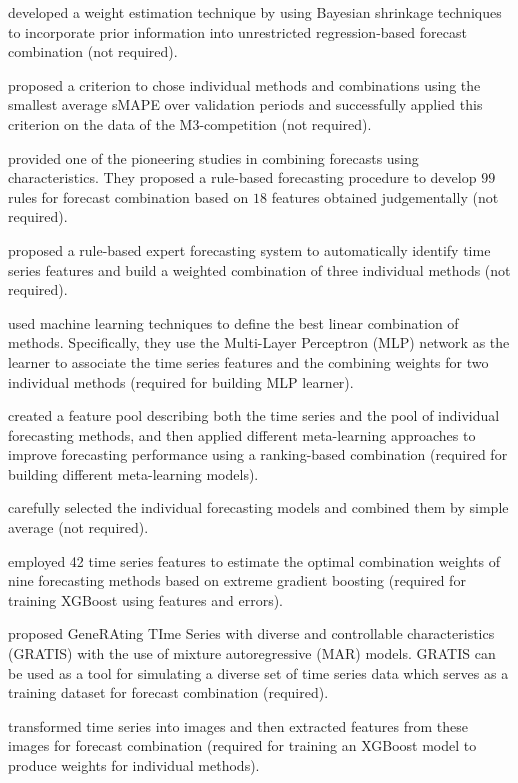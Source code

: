 \documentclass[11pt]{article}
\begin{document}
\cite{diebold1990use} developed a weight estimation technique by using Bayesian shrinkage techniques to incorporate prior information into unrestricted regression-based forecast combination (not required).

\cite{hibon2005combine} proposed a criterion to chose individual methods and combinations using the smallest average sMAPE over validation periods and successfully applied this criterion on the data of the M3-competition (not required).

\cite{collopy1992rule} provided one of the pioneering studies in combining forecasts using characteristics. They proposed a rule-based forecasting procedure to develop $99$ rules for forecast combination based on $18$ features obtained judgementally (not required).

\cite{vokurka1996automatic} proposed a rule-based expert forecasting system to automatically identify time series features and build a weighted combination of three individual methods (not required).

\cite{prudencio2004using} used machine learning techniques to define the best linear combination of methods. Specifically, they use the Multi-Layer Perceptron (MLP) network as the learner to associate the time series features and the combining weights for two individual methods (required for building MLP learner).

\cite{lemke2010meta} created a feature pool describing both the time series and the pool of individual forecasting methods, and then applied different meta-learning approaches to improve forecasting performance using a ranking-based combination (required for building different meta-learning models).

\cite{andrawis2011forecast} carefully selected the individual forecasting models and combined them by simple average (not required).

\cite{montero2020fforma} employed 42 time series features to estimate the optimal combination weights of nine forecasting methods based on extreme gradient boosting (required for training XGBoost using features and errors).

\cite{kang2020gratis} proposed GeneRAting TIme Series with diverse and controllable characteristics (GRATIS) with the use of mixture autoregressive (MAR) models. GRATIS can be used as a tool for simulating a diverse set of time series data which serves as a training dataset for forecast combination (required).

\cite{li2020forecasting} transformed time series into images and then extracted features from these images for forecast combination (required for training an XGBoost model to produce weights for individual methods).
\end{document}
